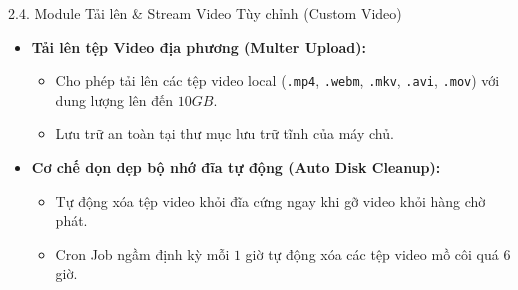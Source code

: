 \documentclass[aspectratio=169,11pt]{beamer}
\begin{document}
\begin{frame}{2.4. Module Tải lên \& Stream Video Tùy chỉnh (Custom Video)}
    \begin{itemize}
        \item \textbf{Tải lên tệp Video địa phương (Multer Upload):}
        \begin{itemize}
            \item Cho phép tải lên các tệp video local (\texttt{.mp4}, \texttt{.webm}, \texttt{.mkv}, \texttt{.avi}, \texttt{.mov}) với dung lượng lên đến $10GB$.
            \item Lưu trữ an toàn tại thư mục lưu trữ tĩnh của máy chủ.
        \end{itemize}
        \vspace{0.2cm}
        
        \item \textbf{Cơ chế dọn dẹp bộ nhớ đĩa tự động (Auto Disk Cleanup):}
        \begin{itemize}
            \item Tự động xóa tệp video khỏi đĩa cứng ngay khi gỡ video khỏi hàng chờ phát.
            \item Cron Job ngầm định kỳ mỗi $1$ giờ tự động xóa các tệp video mồ côi quá $6$ giờ.
        \end{itemize}
    \end{itemize}
\end{frame}
\end{document}

